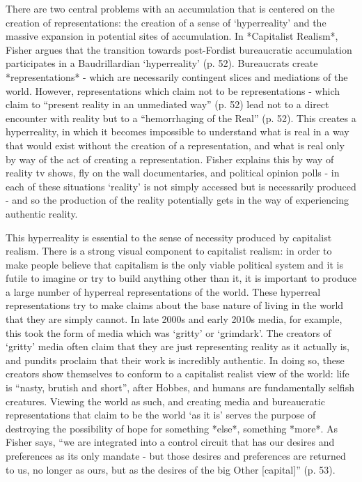 There are two central problems with an accumulation that is centered on
the creation of representations: the creation of a sense of
`hyperreality' and the massive expansion in potential sites of
accumulation. In *Capitalist Realism*, Fisher argues that the transition
towards post-Fordist bureaucratic accumulation participates in a
Baudrillardian `hyperreality' (p. 52). Bureaucrats create
*representations* - which are necessarily contingent slices and
mediations of the world. However, representations which claim not to be
representations - which claim to ``present reality in an unmediated
way'' (p. 52) lead not to a direct encounter with reality but to a
``hemorrhaging of the Real'' (p. 52). This creates a hyperreality, in
which it becomes impossible to understand what is real in a way that
would exist without the creation of a representation, and what is real
only by way of the act of creating a representation. Fisher explains
this by way of reality tv shows, fly on the wall documentaries, and
political opinion polls - in each of these situations `reality' is not
simply accessed but is necessarily produced - and so the production of
the reality potentially gets in the way of experiencing authentic
reality.

This hyperreality is essential to the sense of necessity produced by
capitalist realism. There is a strong visual component to capitalist
realism: in order to make people believe that capitalism is the only
viable political system and it is futile to imagine or try to build
anything other than it, it is important to produce a large number of
hyperreal representations of the world. These hyperreal representations
try to make claims about the base nature of living in the world that
they are simply cannot. In late 2000s and early 2010s media, for
example, this took the form of media which was `gritty' or `grimdark'.
The creators of `gritty' media often claim that they are just
representing reality as it actually is, and pundits proclaim that their
work is incredibly authentic. In doing so, these creators show
themselves to conform to a capitalist realist view of the world: life is
``nasty, brutish and short'', after Hobbes, and humans are fundamentally
selfish creatures. Viewing the world as such, and creating media and
bureaucratic representations that claim to be the world `as it is'
serves the purpose of destroying the possibility of hope for something
*else*, something *more*. As Fisher says, ``we are integrated into a
control circuit that has our desires and preferences as its only mandate
- but those desires and preferences are returned to us, no longer as
ours, but as the desires of the big Other {[}capital{]}'' (p. 53).


